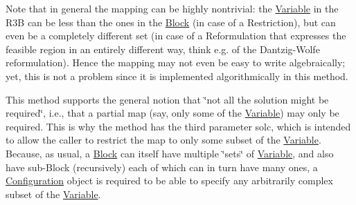 Note that in general the mapping can be highly nontrivial\+: the \mbox{\hyperlink{class_s_m_spp__di__unipi__it_1_1_variable}{Variable}} in the R3B can be less than the ones in the \mbox{\hyperlink{class_s_m_spp__di__unipi__it_1_1_block}{Block}} (in case of a Restriction), but can even be a completely different set (in case of a Reformulation that expresses the feasible region in an entirely different way, think e.\+g. of the Dantzig-\/\+Wolfe reformulation). Hence the mapping may not even be easy to write algebraically; yet, this is not a problem since it is implemented algorithmically in this method.

This method supports the general notion that \char`\"{}not all the solution might
be required\char`\"{}, i.\+e., that a partial map (say, only some of the \mbox{\hyperlink{class_s_m_spp__di__unipi__it_1_1_variable}{Variable}}) may only be required. This is why the method has the third parameter solc, which is intended to allow the caller to restrict the map to only some subset of the \mbox{\hyperlink{class_s_m_spp__di__unipi__it_1_1_variable}{Variable}}. Because, as usual, a \mbox{\hyperlink{class_s_m_spp__di__unipi__it_1_1_block}{Block}} can itself have multiple \char`\"{}sets\char`\"{} of \mbox{\hyperlink{class_s_m_spp__di__unipi__it_1_1_variable}{Variable}}, and also have sub-\/\+Block (recursively) each of which can in turn have many ones, a \mbox{\hyperlink{class_s_m_spp__di__unipi__it_1_1_configuration}{Configuration}} object is required to be able to specify any arbitrarily complex subset of the \mbox{\hyperlink{class_s_m_spp__di__unipi__it_1_1_variable}{Variable}}.

